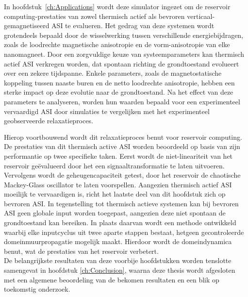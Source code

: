 In hoofdstuk~\ref{ch:Applications} wordt deze \hotspice simulator ingezet om de reservoir computing-prestaties van zowel thermisch actief als bevroren verticaal-gemagnetiseerd ASI te evalueren.
Het gedrag van deze systemen wordt grotendeels bepaald door de wisselwerking tussen verschillende energiebijdragen, zoals de loodrechte magnetische anisotropie en de vorm-anisotropie van elke nanomagneet.
Door een zorgvuldige keuze van systeemparameters kan thermisch actief ASI verkregen worden, dat spontaan richting de grondtoestand evolueert over een zekere tijdspanne.
Enkele parameters, zoals de magnetostatische koppeling tussen naaste buren en de netto loodrechte anisotropie, hebben een sterke impact op deze evolutie naar de grondtoestand.
Na het effect van deze parameters te analyseren, worden hun waarden bepaald voor een experimenteel vervaardigd ASI door simulaties te vergelijken met het experimenteel geobserveerde relaxatieproces. \par
Hierop voortbouwend wordt dit relaxatieproces benut voor reservoir computing.
De prestaties van dit thermisch active ASI worden beoordeeld op basis van zijn performantie op twee specifieke taken.
Eerst wordt de niet-lineariteit van het reservoir ge\"evalueerd door het een signaaltransformatie te laten uitvoeren.
Vervolgens wordt de geheugencapaciteit getest, door het reservoir de chaotische Mackey-Glass oscillator te laten voorspellen.
Aangezien thermisch actief ASI moeilijk te vervaardigen is, richt het laatste deel van dit hoofdstuk zich op bevroren ASI.
In tegenstelling tot thermisch actieve systemen kan bij bevroren ASI geen globale input worden toegepast, aangezien deze niet spontaan de grondtoestand kan bereiken.
In plaats daarvan wordt een methode ontwikkeld waarbij elke inputcyclus uit twee aparte stappen bestaat, hetgeen gecontroleerde domeinmuurpropagatie mogelijk maakt.
Hierdoor wordt de domeindynamica benut, wat de prestaties van het reservoir verbetert. \\

De belangrijkste resultaten van deze voorbije hoofdstukken worden tenslotte samengevat in hoofdstuk \ref{ch:Conclusion}, waarna deze thesis wordt afgesloten met een algemene beoordeling van de bekomen resultaten en een blik op toekomstig onderzoek.
